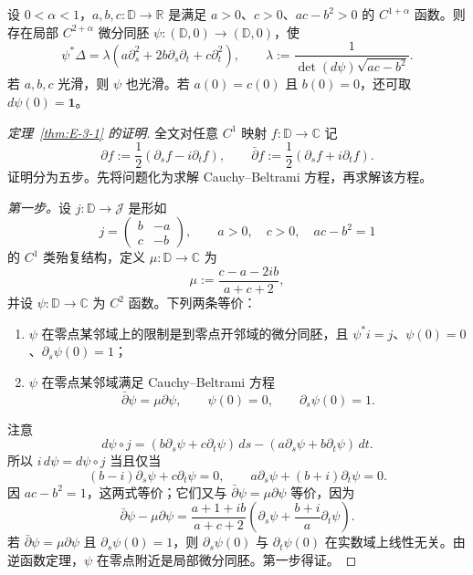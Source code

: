 \begin{corollary}\label{cor:E-3-3}
设 $0<\alpha<1$，$a,b,c:\mathbb D\to\mathbb R$ 是满足 $a>0$、$c>0$、$ac-b^2>0$ 的 $C^{1+\alpha}$ 函数。则存在局部 $C^{2+\alpha}$ 微分同胚 $\psi:(\mathbb D,0)\to(\mathbb D,0)$，使
\[
  \psi^*\Delta=\lambda(a\partial_s^2+2b\partial_s\partial_t+c\partial_t^2),
  \qquad \lambda:=\frac1{\det(d\psi)\sqrt{ac-b^2}}.
\]
若 $a,b,c$ 光滑，则 $\psi$ 也光滑。若 $a(0)=c(0)$ 且 $b(0)=0$，还可取 $d\psi(0)=\mathbf1$。
\end{corollary}

\begin{proof}[定理~\ref{thm:E-3-1} 的证明]
全文对任意 $C^1$ 映射 $f:\mathbb D\to\mathbb C$ 记
\begin{equation}\label{eq:E-3-2}
  \partial f:=\frac12(\partial_sf-i\partial_tf),\qquad
  \bar\partial f:=\frac12(\partial_sf+i\partial_tf).
\end{equation}
证明分为五步。先将问题化为求解 Cauchy--Beltrami 方程，再求解该方程。

\emph{第一步。}设 $j:\mathbb D\to\mathcal J$ 是形如
\[
  j=\begin{pmatrix}b&-a\\c&-b\end{pmatrix},
  \qquad a>0,\quad c>0,\quad ac-b^2=1
\]
的 $C^1$ 类殆复结构，定义 $\mu:\mathbb D\to\mathbb C$ 为
\[
  \mu:=\frac{c-a-2ib}{a+c+2},
\]
并设 $\psi:\mathbb D\to\mathbb C$ 为 $C^2$ 函数。下列两条等价：
\begin{enumerate}
\item[(i)] $\psi$ 在零点某邻域上的限制是到零点开邻域的微分同胚，且 $\psi^*i=j$、$\psi(0)=0$、$\partial_s\psi(0)=1$；
\item[(ii)] $\psi$ 在零点某邻域满足 Cauchy--Beltrami 方程
\begin{equation}\label{eq:E-3-3}
  \bar\partial\psi=\mu\partial\psi,\qquad
  \psi(0)=0,\qquad \partial_s\psi(0)=1.
\end{equation}
\end{enumerate}
注意
\[
  d\psi\circ j=(b\partial_s\psi+c\partial_t\psi)\,ds
  -(a\partial_s\psi+b\partial_t\psi)\,dt.
\]
所以 $i\,d\psi=d\psi\circ j$ 当且仅当
\[
  (b-i)\partial_s\psi+c\partial_t\psi=0,
  \qquad a\partial_s\psi+(b+i)\partial_t\psi=0.
\]
因 $ac-b^2=1$，这两式等价；它们又与 $\bar\partial\psi=\mu\partial\psi$ 等价，因为
\[
  \bar\partial\psi-\mu\partial\psi
  =\frac{a+1+ib}{a+c+2}
   \left(\partial_s\psi+\frac{b+i}{a}\partial_t\psi\right).
\]
若 $\bar\partial\psi=\mu\partial\psi$ 且 $\partial_s\psi(0)=1$，则 $\partial_s\psi(0)$ 与 $\partial_t\psi(0)$ 在实数域上线性无关。由逆函数定理，$\psi$ 在零点附近是局部微分同胚。第一步得证。


\end{proof}
